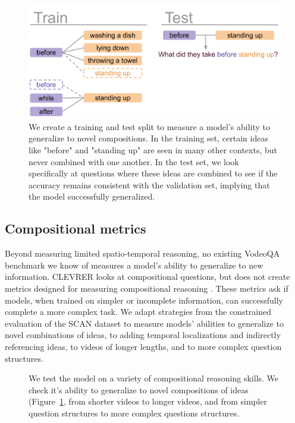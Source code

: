 \documentclass[10pt,twocolumn,letterpaper]{article}
\begin{document}
\begin{figure}[t]
    \centering
    \includegraphics[width=0.95\linewidth]{figures/novel comp.pdf}
    \caption{We create a training and test split to measure a model's ability to generalize to novel compositions. In the training set, certain ideas like "before" and "standing up" are seen in many other contexts, but never combined with one another. In the test set, we look specifically at questions where these ideas are combined to see if the accuracy remains consistent with the validation set, implying that the model successfully generalized.}
    \label{fig:compo_fig}
\end{figure}



\subsection{Compositional metrics}

Beyond measuring limited spatio-temporal reasoning, no existing VodeoQA benchmark we know of measures a model's ability to generalize to new information. CLEVRER looks at compositional questions, but does not create metrics designed for measuring compositional reasoning \cite{yi2019clevrer}. %
These metrics ask if models, when trained on simpler or incomplete information, can successfully complete a more complex task. We adapt strategies from the constrained evaluation of the SCAN dataset \cite{lake2018generalization} to measure models' abilities to generalize to novel combinations of ideas, to adding temporal localizations and indirectly referencing ideas, to videos of longer lengths, and to more complex question structures.


\begin{figure}[t]
\begin{center}

\end{center}
    \caption{We test the model on a variety of compositional reasoning skills. We check it's ability to generalize to novel compositions of ideas (Figure~\ref{fig:compo_fig}, from shorter videos to longer videos, and from simpler question structures to more complex questions structures.}
    \label{table:compo}
\end{figure}
\end{document}
